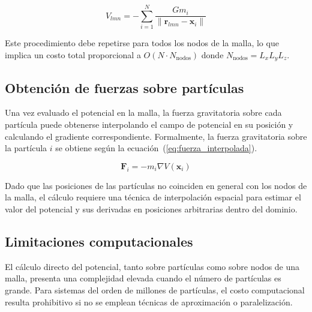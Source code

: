 \documentclass[a4paper,11pt]{book}
\begin{document}
%

\begin{equation}
	V_{lmn} = - \sum_{i=1}^{N} \frac{G m_i}{\|\mathbf{r}_{lmn} - \mathbf{x}_i\|}
	\label{eq:potencial_grilla}
\end{equation}

Este procedimiento debe repetirse para todos los nodos de la malla, lo que implica un costo total proporcional a $O(N \cdot N_{\text{nodos}})$ donde $N_{\text{nodos}} = L_x L_y L_z$.






\subsection{Obtención de fuerzas sobre partículas}

Una vez evaluado el potencial en la malla, la fuerza gravitatoria sobre cada partícula puede obtenerse interpolando el campo de potencial en su posición y calculando el gradiente correspondiente. Formalmente, la fuerza gravitatoria sobre la partícula $i$ se obtiene según la ecuación~(\ref{eq:fuerza_interpolada}).

\begin{equation}
	\mathbf{F}_i = - m_i \nabla V(\mathbf{x}_i)
	\label{eq:fuerza_interpolada}
\end{equation}

Dado que las posiciones de las partículas no coinciden en general con los nodos de la malla, el cálculo requiere una técnica de interpolación espacial para estimar el valor del potencial y sus derivadas en posiciones arbitrarias dentro del dominio.

\subsection{Limitaciones computacionales}

El cálculo directo del potencial, tanto sobre partículas como sobre nodos de una malla, presenta una complejidad elevada cuando el número de partículas es grande. Para sistemas del orden de millones de partículas, el costo computacional resulta prohibitivo si no se emplean técnicas de aproximación o paralelización.
\end{document}
